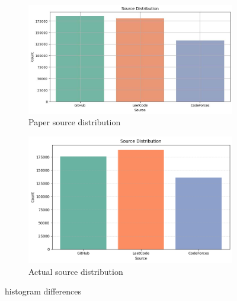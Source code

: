 \begin{figure}[h]
    \centering
    \begin{subfigure}[b]{0.45\textwidth}
        \centering
        \includegraphics[width=\linewidth]{img/CoDet-M4/origianl_histogram_source_distribution.jpeg}
        \caption{Paper source distribution}
        \label{fig:immagine1}
    \end{subfigure}
    \hfill
    \begin{subfigure}[b]{0.45\textwidth}
        \centering
        \includegraphics[width=\linewidth]{img/CoDet-M4/histogram_source_distribution_MY.png}
        \caption{Actual source distribution}
        \label{fig:immagine2}
    \end{subfigure}
    \caption{histogram differences}
    \label{fig:CoDet-M4_histogram_differences}
\end{figure}






